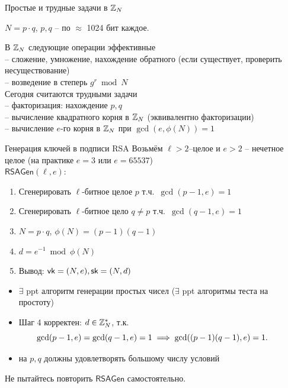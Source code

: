 \documentclass[usenames,dvipsnames,8pt,aspectratio=169]{beamer}
\begin{document}
\begin{frame}{Простые и трудные задачи в ${{\mathbb Z}}_N$}
\Large 
\begin{center}
{\color{Orange}  $N = p \cdot q$},  $p, q$ -- по $\approx$ 1024 бит каждое.\\
\end{center}
	В ${{\mathbb Z}}_N$ следующие операции  {\color{Orange} эффективные}  \\[5pt]
	-- сложение, умножение, нахождение обратного (если существует, проверить несуществование)\\[3pt]
	--  возведение в степерь $g^r \bmod N$ \\[14pt]
	Сегодня  {\color{Orange} считаются трудными} задачи \\[5pt]
	 -- {\color{Orange} факторизация}: нахождение $p, q$  \\[3pt]
	 -- вычисление квадратного корня в ${{\mathbb Z}}_N$ (эквивалентно факторизации) \\[3pt]
	 -- вычисление $e$-го корня в  ${{\mathbb Z}}_N$ при $\gcd(e, \phi(N)) = 1$\\
\end{frame}

\begin{frame}{Генерация ключей в подписи RSA}
\Large
Возьмём $\ell>2$--целое и $e>2$ -- нечетное целое (на практике $e=3$  или $e=65537$) \\[8pt]
{\color{Orange} $\mathsf{RSAGen}(\ell, e):$}
\begin{enumerate}
	\itemsep5pt
	\item Сгенерировать $\ell$-битное целое $p$ т.ч.\ $\gcd(p-1, e)=1$
	\item Сгенерировать  $\ell$-битное цело $q \neq p$ т.ч.\ $\gcd(q-1, e)=1$
	\item $N= p \cdot q$, $\phi(N) = (p-1)(q-1)$
	\item $d = e^{-1} \bmod \phi(N)$
	\item Вывод: $\textsf{vk} = (N, e), \textsf{sk}=(N, d)$
\end{enumerate}
\large
\pause
\begin{itemize}
	\item  $\exists$ ppt алгоритм генерации простых чисел ($\exists$  ppt алгоритмы теста на простоту)
	\item Шаг 4 корректен:  $d \in {{\mathbb Z}}_N^\ast$, т.к. \[ \hspace{-20pt} \gcd(p-1, e) = \gcd(q-1, e) = 1 \implies \gcd((p-1)(q-1), e)=1.\]
	\item на $p,q$ должны удовлетворять  {\color{Orange} большому числу условий} 
\end{itemize}
\centering
\Large Не пытайтесь повторить $\mathsf{RSAGen}$ самостоятельно. 
\end{frame}
\end{document}

